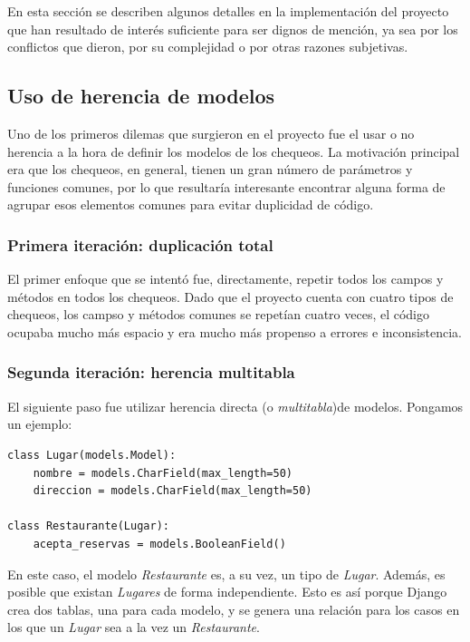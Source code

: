 En esta sección se describen algunos detalles en la implementación del proyecto
que han resultado de interés suficiente para ser dignos de mención, ya sea por
los conflictos que dieron, por su complejidad o por otras razones subjetivas.

\subsection{Uso de herencia de modelos}

Uno de los primeros dilemas que surgieron en el proyecto fue el usar o no
herencia a la hora de definir los modelos de los chequeos. La motivación
principal era que los chequeos, en general, tienen un gran número de parámetros
y funciones comunes, por lo que resultaría interesante encontrar alguna forma de
agrupar esos elementos comunes para evitar duplicidad de código.

\subsubsection{Primera iteración: duplicación total}

El primer enfoque que se intentó fue, directamente, repetir todos los campos y
métodos en todos los chequeos. Dado que el proyecto cuenta con cuatro tipos de
chequeos, los campso y métodos comunes se repetían cuatro veces, el código
ocupaba mucho más espacio y era mucho más propenso a errores e inconsistencia.

\subsubsection{Segunda iteración: herencia multitabla}

El siguiente paso fue utilizar herencia directa (o \textit{multitabla})de
modelos. Pongamos un ejemplo:

\begin{verbatim}
class Lugar(models.Model):
    nombre = models.CharField(max_length=50)
    direccion = models.CharField(max_length=50)

class Restaurante(Lugar):
    acepta_reservas = models.BooleanField()
\end{verbatim}

En este caso, el modelo \textit{Restaurante} es, a su vez, un tipo de
\textit{Lugar}. Además, es posible que existan \textit{Lugares} de forma
independiente. Esto es así porque Django crea dos tablas, una para cada modelo,
y se genera una relación para los casos en los que un \textit{Lugar} sea a la
vez un \textit{Restaurante}.

